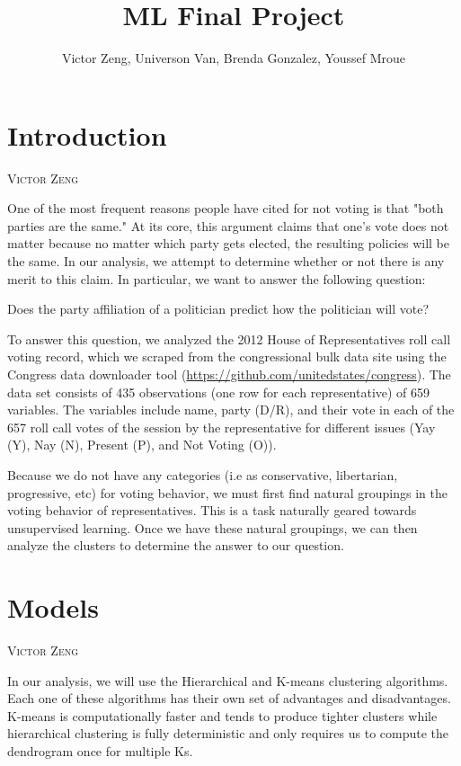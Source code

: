 \documentclass[12pt]{article}
\title{ML Final Project}
\author{Victor Zeng, Universon Van, Brenda Gonzalez, Youssef Mroue}
\makeatletter
\newcommand{\chapterauthor}[1]{%
	{\parindent0pt\vspace*{-10pt}%
		\linespread{1.1}\large\scshape#1%
		\par\nobreak\vspace*{10pt}}
	\@afterheading%
}
\makeatother
\begin{document}
\maketitle
\newtheorem*{claim}{Claim:}
\newtheorem*{lemma}{Lemma}

\section{Introduction}
\chapterauthor{Victor Zeng}

One of the most frequent reasons people have cited for not voting is that "both parties are the same." At its core, this argument claims that one's vote does not matter because no matter which party gets elected, the resulting policies will be the same. 
In our analysis, we attempt to determine whether or not there is any merit to this claim. In particular, we want to answer the following question: 
\begin{center}
	Does the party affiliation of a politician predict how the politician will vote?  
\end{center}

To answer this question, we analyzed the 2012 House of Representatives roll call voting record, which we scraped  from the congressional bulk data site using the Congress data downloader tool  (\url{https://github.com/unitedstates/congress}). The data set consists of 435 observations (one row for each representative) of 659 variables. The variables include name, party (D/R), and their vote in each of the 657 roll call votes of the session by the representative for different issues (Yay (Y), Nay (N), Present (P), and Not Voting (O)).

Because we do not have any categories (i.e as conservative, libertarian, progressive, etc) for voting behavior, we must first find natural groupings in the voting behavior of representatives. This is a task naturally geared towards unsupervised learning. Once we have these natural groupings, we can then analyze the clusters to determine the answer to our question.
\section{Models}
\chapterauthor{Victor Zeng}
In our analysis, we will use the  Hierarchical and K-means clustering algorithms. Each one of these algorithms has their own set of advantages and disadvantages. K-means is computationally faster and tends to produce tighter clusters while hierarchical clustering is fully deterministic and only requires us to compute the dendrogram once for multiple Ks. 
\end{document}
